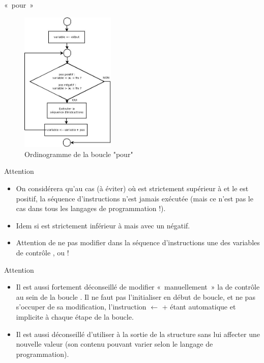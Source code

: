 \begin{frame}{«~pour~»}
	\begin{figure}[h]
		\centering
		\includegraphics[width=0.4\textwidth]{image/boucle-pour}
		\caption{Ordinogramme de la boucle "pour"}
		\label{fig:boucle-pour}
		\end{figure}
\end{frame}

\begin{frame}{Attention}
	\begin{itemize}
		\item
		On considérera
		qu’au cas (à éviter) où  est strictement supérieur à
		 et le  est positif, la séquence d’instructions
		n’est jamais exécutée (mais ce n’est pas le cas dans tous les langages
		de programmation !). 
		\item
		Idem si  est strictement inférieur à
		 mais avec un  négatif.
		\item
		Attention de ne pas modifier dans la séquence d’instructions une des
		variables de contrôle ,  ou  !
	\end{itemize}
\end{frame}

\begin{frame}{Attention}
	\begin{itemize}
		\item
		Il est aussi fortement déconseillé de modifier «~manuellement~» la
		 de contrôle au sein de la boucle
		. Il ne faut pas l’initialiser en début de boucle,
		et ne pas s’occuper de sa modification, l’instruction 
		 $\leftarrow$  +  
		étant automatique et implicite à chaque étape de la
		boucle.
		\item
		Il est aussi déconseillé d’utiliser  à la
		sortie de la structure  sans lui affecter une
		nouvelle valeur (son contenu pouvant varier selon le langage de
		programmation).
	\end{itemize}
\end{frame}


